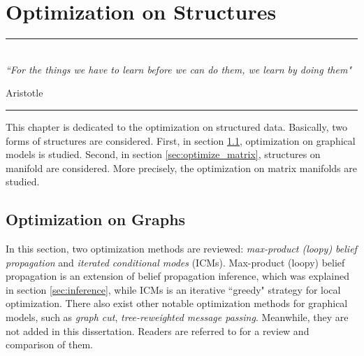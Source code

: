 
\chapter{Optimization on Structures} %
\label{Chapter5} %



\rule{\textwidth}{0.4pt} \\[0.5cm]
\textit{``For the things we have to learn before we can do them, we learn by doing them"}

\begin{flushright}
Aristotle
\end{flushright}
\rule{\textwidth}{0.4pt} 
\newline 
\newline 
This chapter is dedicated to the optimization on structured data. Basically, two forms of structures are considered. First, in section          
\ref{sec:optimize_graph}, optimization on graphical models is studied. Second, in section \ref{sec:optimize_matrix}, structures on 
manifold are considered. More precisely, the optimization on matrix manifolds are studied. 

\section{Optimization on Graphs}
\label{sec:optimize_graph}
In this section, two optimization methods are reviewed: \emph{max-product (loopy) belief propagation} and \emph{iterated conditional modes} (ICMs).  
Max-product (loopy) belief propagation is an extension of belief propagation inference, which was explained in section \ref{sec:inference}, while 
ICMs is an iterative ``greedy" strategy for local optimization.    
There also exist other notable optimization methods for graphical models, such as \emph{graph cut}, \emph{tree-reweighted message passing}. 
Meanwhile, they are not added in this dissertation. Readers are referred to \cite{many_optimizations} for a review and comparison of them.   



